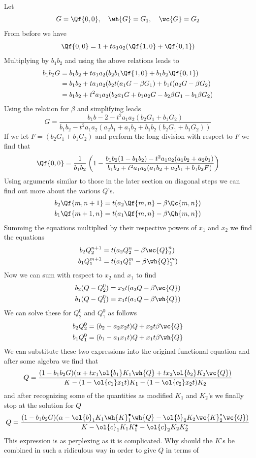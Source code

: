 Let
\[
	G = \Qf{0,0}, \quad\wh{G} = G_1, \quad\wc{G} = G_2
\]
From before we have
\[
	\Qf{0,0} = 1 + t a_1a_2(\Qf{1,0}+\Qf{0,1})
\]
Multiplying by $b_1b_2$ and using the above relations leads to
\begin{align*}
b_1b_2 G &= b_1b_2 + ta_1a_2(b_2b_1\Qf{1,0}+b_1b_2\Qf{0,1})\\
                 &=b_1b_2 + ta_1a_2(b_2t(a_1G-\beta G_1)+b_1t(a_2 G- \beta G_2)\\
                 &=b_1b_2 + t^2a_1a_2(b_2a_1G+b_1a_2G-b_2\beta G_1-b_1\beta G_2)
\end{align*}
Using the relation for $\beta$ and simplifying leads 
\[
	G = \frac{b_1b-2 - t^2 a_1a_2(b_2G_1+b_1G_2)}{b_1b_2 - t^2a_1a_2 (a_2b_1+a_1b_2+b_1b_2(b_2G_1+b_1G_2))}
\]
If we let $F = (b_2G_1+b_1G_2)$ and perform the long division with respect to $F$ we find that
\[
	\Qf{0,0} = \frac{1}{b_1b_2}\left(1-\frac{b_1b_2(1-b_1b_2)-t^2a_1a_2(a_1b_2+a_2b_1)}{b_1b_2+t^2a_1a_2(a_1b_2+a_2b_1+b_1b_2 F)}\right)
\]
Using arguments similar to those in the later section on diagonal steps we can find out more about the various $Q$'s.
\begin{align*}
	b_2\Qf{m,n+1} &= t(a_2\Qf{m,n}-\beta \Qc{m,n})\\
	b_1\Qf{m+1,n} &= t(a_1\Qf{m,n}-\beta \Qh{m,n})
\end{align*}
Summing the equations multiplied by their respective powers of $x_1$ and $x_2$ we find the equations
\begin{align*}
	b_2 Q_2^{n+1} &= t(a_2Q_2^n-\beta \wc{Q}_2^n)\\
	b_1 Q_1^{m+1} &= t(a_1Q_1^m-\beta \wh{Q}_1^m)
\end{align*}
Now we can sum with respect to $x_2$ and $x_1$ to find
\begin{align*}
	b_2 (Q-Q_2^0) &= x_2t(a_2Q - \beta \wc{Q})\\
	b_1 (Q-Q_1^0) &= x_1t(a_1Q - \beta \wh{Q})
\end{align*}
We can solve these for $Q_2^0$ and $Q_1^0$ as follows
\begin{align*}
	b_2Q_2^0 &= (b_2-a_2x_2t)Q + x_2t\beta \wc{Q}\\
	b_1Q_1^0 &= (b_1-a_1x_1t)Q + x_1t\beta \wh{Q}\\
\end{align*}
We can substitute these two expressions into the original functional equation and after some algebra we find that
\[
	Q = \frac{(1-b_1b_2 G)(\alpha + tx_1\ol{b_1}K_1\wh{Q}+tx_2\ol{b_2}K_2 \wc{Q})}{K-(1-\ol{c_1}x_1t)K_1-(1-\ol{c_2}x_2t)K_2}
\]
and after recognizing some of the quantities as modified $K_1$ and $K_2$'s we finally stop at the solution for $Q$
\[
	Q = \frac{(1-b_1b_2 G)(\alpha - \ol{b}_1 K_1 \wh{K}_1^\bullet \wh{Q}-\ol{b}_2K_2\wc{K}_2^\ast \wc{Q})}{K - \ol{c}_1 K_1 K_1^\bullet - \ol{c}_2 K_2 K_2^\ast}
\]
This expression is as perplexing as it is complicated. Why should the $K$'s be combined in such a ridiculous way in order to give $Q$ in terms of 
